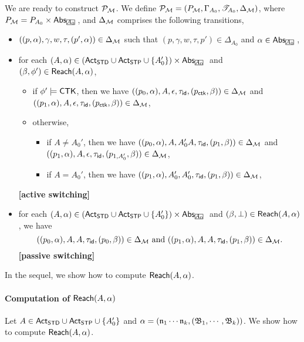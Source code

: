 We are ready to construct ${\mathcal{P} }_{\mathcal{M} }$. 
We define ${\mathcal{P} }_{{\mathcal{M} }} = (P_{{\mathcal{M} }}, \Gamma_{A_0}, {\mathscr{T} }_{A_0}, \Delta_{{\mathcal{M} }})$, where $P_{\Mm} = P_{A_0} \times \abs_{\mhcancel{A_0}}$, and $\Delta_{{\mathcal{M} }}$ comprises the following transitions,
\begin{itemize}
    \item $((p, \alpha), \gamma, w, \tau, (p', \alpha)) \in \Delta_{{\mathcal{M} }}$ such that $(p, \gamma, w, \tau, p') \in \Delta_{A_0}$ and $\alpha\in\abs_{\mhcancel{A_0}}$,
    \item for each $(A, \alpha) \in (\act_{\standard} \cup \act_{\singletop} \cup \{A_0'\}) \times \abs_{\mhcancel{A_0}}$ and $(\beta,\phi')\in{\sf Reach}(A,\alpha)$, 
        \begin{itemize}
            \item if $\phi' \models {\sf CTK}$, then we have $((p_0, \alpha), A, \epsilon, \tau_{\mathsf{id}}, (p_{\sf ctk}, \beta)) \in \Delta_{{\mathcal{M} }}$ and $((p_1, \alpha), A, \epsilon, \tau_{\mathsf{id}}, (p_{\sf ctk}, \beta)) \in \Delta_{{\mathcal{M} }}$,
            \item otherwise,
            \begin{itemize}
                \item if $A\neq A_0'$, then we have
                    $((p_0, \alpha), A, A_0'A, \tau_{\mathsf{id}}, (p_1, \beta)) \in \Delta_{{\mathcal{M} }}$ and $((p_1, \alpha), A, \epsilon, \tau_{\mathsf{id}}, (p_{1, A'_0}, \beta)) \in \Delta_{{\mathcal{M} }}$,
                \item if $A=A_0'$, then we have $((p_1, \alpha), A_0', A_0', \tau_{\mathsf{id}}, (p_1, \beta)) \in \Delta_{{\mathcal{M} }}$,
            \end{itemize}
        \end{itemize}
                \textbf{[active switching]}
    \item for each $(A,\alpha) \in (\act_{\standard} \cup \act_{\singletop} \cup \{A_0'\}) \times \abs_{\mhcancel{A_0}}$ and $(\beta,\bot)\in{\sf Reach}(A,\alpha)$, we have 
    $$((p_0, \alpha), A, A, \tau_{\mathsf{id}}, (p_0, \beta)) \in \Delta_{{\mathcal{M} }} \mbox{ and } ((p_1, \alpha), A, A, \tau_{\mathsf{id}}, (p_1, \beta)) \in \Delta_{{\mathcal{M} }}.$$
            \textbf{[passive switching]}
\end{itemize}

In the sequel, we show how to compute ${\sf Reach}(A, \alpha)$. 

\paragraph*{Computation of ${\sf Reach}(A, \alpha)$}
Let $A \in {\sf Act}_{\sf STD} \cup {\sf Act}_{\sf STP} \cup \{A'_0\}$ and $\alpha = (\mathfrak{n}_1 \cdots \mathfrak{n}_k, ({\mathfrak{B} }_1, \cdots, {\mathfrak{B} }_k))$. 
We show how to compute ${\sf Reach}(A, \alpha)$. 

